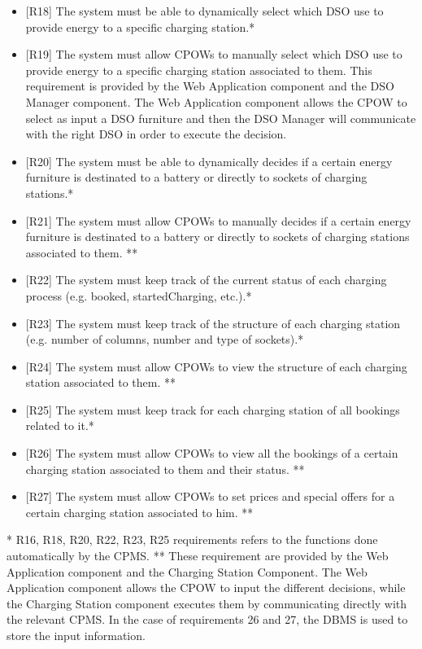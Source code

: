\documentclass[a4paper]{report}
\begin{document}
\begin{itemize}
    \item{[R18]} \label{R18} The system must be able to dynamically select which DSO use to provide energy to a specific charging station.*
    \item{[R19]} \label{R19} The system must allow CPOWs to manually select which DSO use to provide energy to a specific charging station associated to them. This requirement is provided by the Web Application component and the DSO Manager component. The Web Application component allows the CPOW to select as input a DSO furniture and then the DSO Manager will communicate with the right DSO in order to execute the decision. 
    \item{[R20]} \label{R20} The system must be able to dynamically decides if a certain energy furniture is destinated to a battery or directly to sockets of charging stations.*
    \item{[R21]} \label{R21} The system must allow CPOWs to manually decides if a certain energy furniture is destinated to a battery or directly to sockets of charging stations associated to them. **
    \item{[R22]} \label{R22} The system must keep track of the current status of each charging process (e.g. booked, startedCharging, etc.).*
    \item{[R23]} \label{R23} The system must keep track of the structure of each charging station (e.g. number of columns, number and type of sockets).*
    \item{[R24]} \label{R24} The system must allow CPOWs to view the structure of each charging station associated to them. **
    \item{[R25]} \label{R25} The system must keep track for each charging station of all bookings related to it.*
    \item{[R26]} \label{R26} The system must allow CPOWs to view all the bookings of a certain charging station associated to them and their status. **
    \item{[R27]} \label{R27} The system must allow CPOWs to set prices and special offers for a certain charging station associated to him. **
\end{itemize}
* R16, R18, R20, R22, R23, R25 requirements refers to the functions done automatically by the CPMS.\newline
** These requirement are provided by the Web Application component and the Charging Station Component. The Web Application component allows the CPOW to input the different decisions, while the Charging Station component executes them by communicating directly with the relevant CPMS. In the case of requirements 26 and 27, the DBMS is used to store the input information.
\end{document}
